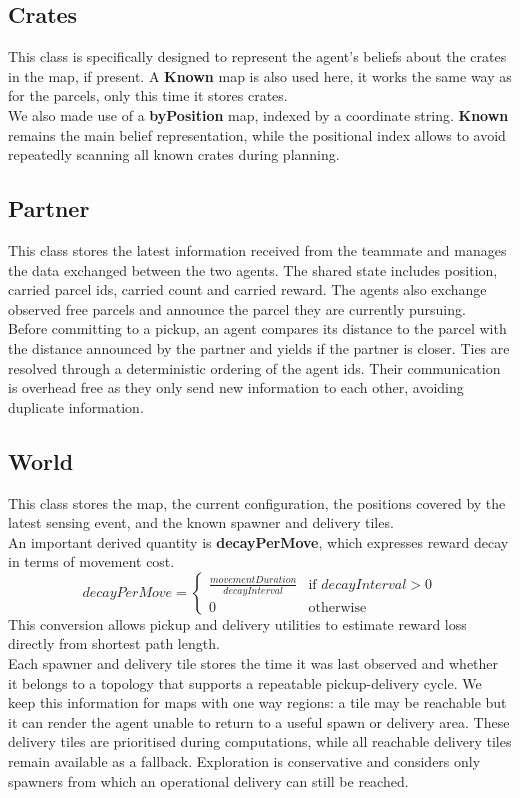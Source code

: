 \documentclass[11pt,a4paper]{article}
\begin{document}
\subsection{Crates}
This class is specifically designed to represent the agent's beliefs about the crates in the map, if present.
A \textbf{Known} map is also used here, it works the same way as for the parcels, only this time it stores crates.
\\We also made use of a \textbf{byPosition} map, indexed by a coordinate string.
\textbf{Known} remains the main belief representation, while the positional index allows to avoid repeatedly scanning all known crates during planning.

\subsection{Partner}
This class stores the latest information received from the teammate and manages the data exchanged between the two agents. 
The shared state includes position, carried parcel ids, carried count and carried reward. 
The agents also exchange observed free parcels and announce the parcel they are currently pursuing.
\\Before committing to a pickup, an agent compares its distance to the parcel with the distance announced by the partner and yields if the partner is closer.
Ties are resolved through a deterministic ordering of the agent ids.
Their communication is overhead free as they only send new information to each other, avoiding duplicate information.

\subsection{World}
This class stores the map, the current configuration, the positions covered by the latest sensing event, and the known spawner and delivery tiles.
\\An important derived quantity is \textbf{decayPerMove}, which expresses reward decay in terms of movement cost.
\begin{equation*}
    decayPerMove=
    \begin{cases}
        \frac{movementDuration}{decayInterval} & \text{if } decayInterval > 0 \\
        0 & \text{otherwise}
    \end{cases}
\end{equation*}
This conversion allows pickup and delivery utilities to estimate reward loss directly from shortest path length. 
\\Each spawner and delivery tile stores the time it was last observed and whether it belongs to a topology that supports a repeatable pickup-delivery cycle.
We keep this information for maps with one way regions: a tile may be reachable but it can render the agent unable to return to a useful spawn or delivery area.
These delivery tiles are prioritised during computations, while all reachable delivery tiles remain available as a fallback. 
Exploration is conservative and considers only spawners from which an operational delivery can still be reached.
\end{document}
